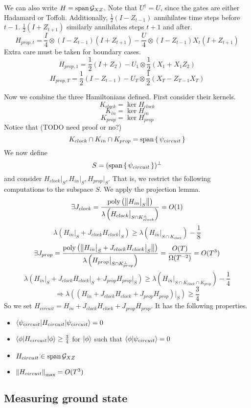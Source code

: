 We can also write $H=\operatorname*{\operatorname{span}}\mathcal{G}_{XZ}$. Note that $U^\dagger=U$, since the gates are either Hadamard or Toffoli. Additionally, $\frac{1}{2}(I-Z_{t-1})$ annihilates time steps before $t-1$. $\frac{1}{2}(I+Z_{t+1})$ similarly annihilates steps $t+1$ and after.
$$H_{prop,t}=\frac{I}{4}\otimes(I-Z_{t-1})(I+Z_{t+1})-\frac{U}{4}\otimes(I-Z_{t-1})X_t(I+Z_{t+1})$$
Extra care must be taken for boundary cases.
$$H_{prop,1}=\frac{1}{2}(I+Z_2)-U_1\otimes\frac{1}{2}(X_1+X_1Z_2)$$
$$H_{prop,T}=\frac{1}{2}(I-Z_{t-1})-U_T\otimes\frac{1}{2}(X_T-Z_{T-1}X_T)$$

Now we combine the three Hamiltonians defined. First consider their kernels.
$$K_{clock}=\ker H_{clock}$$
$$K_{in}=\ker H_{in}$$
$$K_{prop}=\ker H_{prop}$$
Notice that (TODO need proof or no?)
$$K_{clock}\cap K_{in}\cap K_{prop}=\operatorname*{\operatorname{span}}\set{\psi_{circuit}}$$
We now define
$$S=(\operatorname*{\operatorname{span}}\set{\psi_{circuit}})^\bot$$
and consider $H_{clock}\big|_S,H_{in}\big|_S,H_{prop}\big|_S$. That is, we restrict the following computations to the subspace $S$. We apply the projection lemma.
$$\exists J_{clock}
=\frac{\operatorname*{\operatorname{poly}}\left(\left\lVert H_{in}\big|_S\right\rVert\right)}{\lambda\left(H_{clock}\big|_{S\cap K^\bot_{clock}}\right)}
=O(1)$$
$$\lambda(H_{in}\big|_S+J_{clock}H_{clock}\big|_S)\geq
\lambda(H_{in}\big|_{S\cap K_{clock}})-\frac{1}{8}$$
$$\exists J_{prop}=\frac{\operatorname*{\operatorname{poly}}\left(\left\lVert H_{in}\big|_S+J_{clock}H_{clock}\big|_S\right\rVert\right)}{\lambda\left(H_{prop}\big|_{S\cap K^\bot_{prop}}\right)}
=\frac{O(T)}{\Omega(T^{-2})}=O(T^3)$$
$$\lambda(H_{in}\big|_S+J_{clock}H_{clock}\big|_S+J_{prop}H_{prop}\big|_S)\geq
\lambda(H_{in}\big|_{S\cap K_{clock}\cap K_{prop}})-\frac{1}{4}$$
$$\Rightarrow\lambda((H_{in}+J_{clock}H_{clock}+J_{prop}H_{prop})\big|_S)\geq\frac{3}{4}$$
So we set $H_{circuit}=H_{in}+J_{clock}H_{clock}+J_{prop}H_{prop}$. It has the following properties.
\begin{itemize}
	\item $\braket{\psi_{circuit}|H_{circuit}|\psi_{circuit}}=0$
	\item $\braket{\phi|H_{circuit}|\phi}\geq\frac{3}{4}$ for $\ket\phi$ such that $\braket{\phi|\psi_{circuit}}=0$
	\item $H_{circuit}\in\operatorname*{\operatorname{span}}\mathcal{G}_{XZ}$
	\item $\left\lVert H_{circuit}\right\rVert_{\max}=O(T^3)$
\end{itemize}

\subsection{Measuring ground state}

